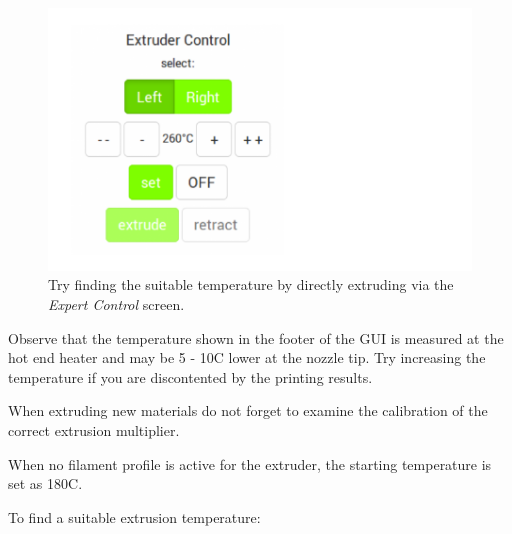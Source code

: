 \begin{figure}[H]
  \centering
  \includegraphics[width=.7\linewidth]{./img/gui_expertmenu_2_v110.png}
  \caption{Try finding the suitable temperature by directly extruding via the 
           \emph{Expert Control} screen.}
\end{figure}

\begin{info}
  Observe that the temperature shown in the footer of the GUI is measured at the hot end heater and may be 5 - 10\degree C lower at the nozzle tip. Try increasing the temperature if you are discontented by the printing results.

  When extruding new materials do not forget to examine the calibration of the correct extrusion multiplier.

  When no filament profile is active for the extruder, the starting temperature 
  is set as 180\degree C.
\end{info}

To find a suitable extrusion temperature: 

